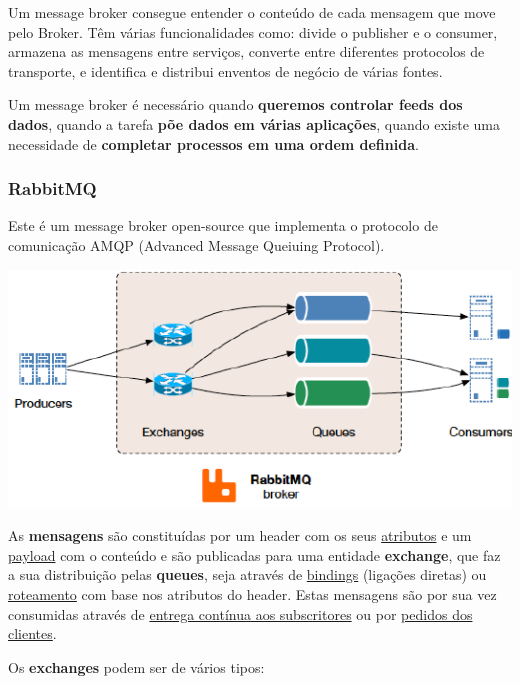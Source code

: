 \documentclass{article}
\begin{document}
Um message broker consegue entender o conteúdo de cada mensagem que
move pelo Broker. Têm várias funcionalidades como:
divide o publisher e o consumer, armazena as mensagens entre serviços,
converte entre diferentes protocolos de transporte, e
identifica e distribui enventos de negócio
de várias fontes.

\vspace{2mm}

Um message broker é necessário quando \textbf{queremos controlar
feeds dos dados}, quando a tarefa \textbf{põe dados em várias
aplicações}, quando existe uma necessidade de \textbf{completar
processos em uma ordem definida}.

\subsubsection*{RabbitMQ}

Este é um message broker open-source que implementa o protocolo de comunicação AMQP
(Advanced Message Queiuing Protocol).

\begin{center}
  \includegraphics[scale=0.6]{110}
\end{center}

\pagebreak

As \textbf{mensagens} são constituídas por um header com os seus \uline{atributos} e um \uline{payload} com o
conteúdo e são publicadas para uma entidade \textbf{exchange}, que faz a sua distribuição pelas
\textbf{queues}, seja através de \uline{bindings} (ligações diretas) ou \uline{roteamento} com base nos atributos do
header. Estas mensagens são por sua vez consumidas através de \uline{entrega contínua aos
subscritores} ou por \uline{pedidos dos clientes}.

\vspace{2mm}

Os \textbf{exchanges} podem ser de vários tipos:
\end{document}
